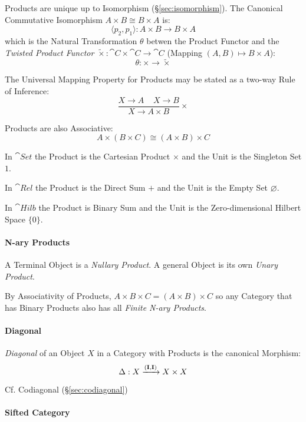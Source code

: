 Products are unique up to Isomorphism (\S\ref{sec:isomorphism}). The
Canonical Commutative Isomorphism $A \times B \cong B \times A$ is:
\[
  \langle p_2, p_1 \rangle : A \times B \rightarrow B \times A
\]
which is the Natural Transformation $\theta$ betwen the Product
Functor and the \emph{Twisted Product Functor} $\tilde{\times} :
\cat{C} \times \cat{C} \rightarrow \cat{C}$ (Mapping $(A,B)
\mapsto B \times A$):
\[
  \theta : \times \rightarrow \tilde{\times}
\]

The Universal Mapping Property for Products may be stated as a two-way
Rule of Inference:
\[
  {
    \frac{X \rightarrow A \;\;\;\; X \rightarrow B}
    {X \rightarrow A \times B}
  }\times
\]

Products are also Associative:
\[
  A \times (B \times C) \cong (A \times B) \times C
\]

In $\cat{Set}$ the Product is the Cartesian Product $\times$ and the
Unit is the Singleton Set $1$.

In $\cat{Rel}$ the Product is the Direct Sum $+$ and the Unit is
the Empty Set $\varnothing$.

In $\cat{Hilb}$ the Product is Binary Sum and the Unit is the
Zero-dimensional Hilbert Space $\{ 0 \}$. %



\paragraph{N-ary Products}\label{sec:category_nary}\hfill
A Terminal Object is a \emph{Nullary Product}. A general Object is its
own \emph{Unary Product}.

By Associativity of Products, $A \times B \times C = (A \times B)
\times C$ so any Category that has Binary Products also has all
\emph{Finite N-ary Products}.



\paragraph{Diagonal}\label{sec:diagonal}\hfill

\emph{Diagonal} of an Object $X$ in a Category with Products is the
canonical Morphism:
\[
  \Delta : X \xrightarrow{(\mathbf{I},\mathbf{I})} X \times X
\]

\fist Cf. Codiagonal (\S\ref{sec:codiagonal})



\paragraph{Sifted Category}\label{sec:sifted_category}\hfill

